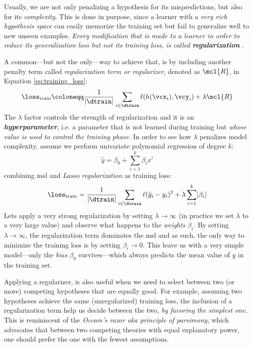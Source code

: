 Usually, we are not only penalizing a hypothesis for its mispredictions, but
also for its \emph{complexity}. This is done in purpose, since a learner with a
\emph{very rich hypothesis space} can easily memorize the training set but fail
to generalize well to new unseen examples. \emph{Every modification that is made
to a learner in order to reduce its generalization loss but not its training
loss, is called \textbf{regularization}} \parencite{deeplearning}.

A common---but not the only---way to achieve that, is by including another
penalty term called \emph{regularization term or
regularizer}, denoted as $\mcl{R}$, in Equation
\ref{eq:training_loss}:
\begin{equation}
	\label{eq:regularization}
	\loss_\text{train} \coloneqq \frac{1}{\lvert \dtrain \rvert} \sum_{i \in \dtrain}
	\ell(h(\vcx_i), \vcy_i)
	+
	\lambda \mcl{R}
\end{equation}
The $\lambda$ factor controls the strength of regularization and it is an
\emph{\textbf{hyperparameter}}, i.e. a parameter that is
not learned during training but \emph{whose value is used to control the
training phase.} In order to see how $\lambda$ penalizes model complexity,
assume we perform univariate polynomial regression
of degree $k$:
\begin{equation}
	\hat{y} = \beta_0 + \sum_{i=1}^k \beta_i x^i
\end{equation}
combining \gls{msl} and \emph{Lasso
regularization} as training loss:
\begin{equation}
	\label{eq:lasso}
	\loss_\text{train} = \frac{1}{\lvert \dtrain \rvert} \sum_{i \in \dtrain}
	\ell(\hat{y}_i - y_i)^2
	+
	\lambda \sum_{i=1}^k \lvert \beta_i \rvert
\end{equation}
Lets apply a very strong regularization by setting $\lambda \to \infty$ (in
practice we set $\lambda$ to a very large value) and observe what happens to the
\emph{weights} $\beta_i$. By setting $\lambda \to
\infty$, the regularization term dominates the \gls{msl} and as such, the only
way to minimize the training loss is by setting $\beta_i \to 0$. This leave us
with a very simple model---only the \emph{bias} $\beta_0$
survives---which always predicts the mean value of $y$ in the training set.

Applying a regularizer, is also useful when we need to select
between two (or more) competing hypotheses that are equally good. For example,
assuming two hypotheses achieve the same (unregularized) training loss, the
inclusion of a regularization term help us decide between the two, \emph{by
favoring the simplest one}. This is reminiscent of the \emph{Occam's razor aka
principle of parsimony}, which advocates that between two competing theories
with equal explanatory power, one should prefer the one with the fewest
assumptions.

